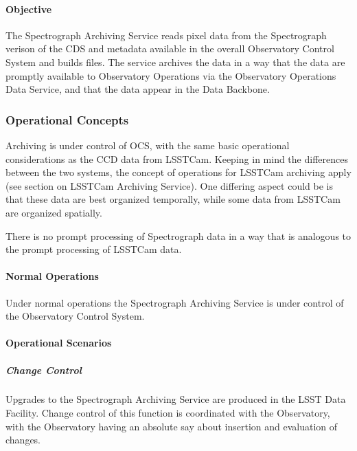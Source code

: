 \paragraph{Objective}

The Spectrograph Archiving Service reads pixel data from the Spectrograph verison of
the CDS and metadata available in the overall Observatory Control System and builds files.
The service archives the data in a way that the data are promptly available to Observatory
Operations via the Observatory Operations Data Service, and that the data appear in the Data
Backbone.

\subsubsection{Operational Concepts}

Archiving is under control of OCS, with the same basic operational
considerations as the CCD data from LSSTCam. Keeping
in mind the differences between the two systems, the concept of
operations for LSSTCam archiving apply (see section on LSSTCam Archiving Service).
One differing aspect could be is that these data are best organized temporally,
while some data from LSSTCam are organized spatially.

There is no prompt processing of Spectrograph data in a way that is
analogous to the prompt processing of LSSTCam data.

\paragraph{Normal Operations}

Under normal operations the Spectrograph Archiving Service is under control of the Observatory
Control System.

\paragraph{Operational Scenarios}

\subparagraph{Change Control}
Upgrades to the Spectrograph Archiving Service are produced in the LSST Data Facility.
Change control of this function is coordinated with the Observatory, with the Observatory
having an absolute say about insertion and evaluation of changes.
